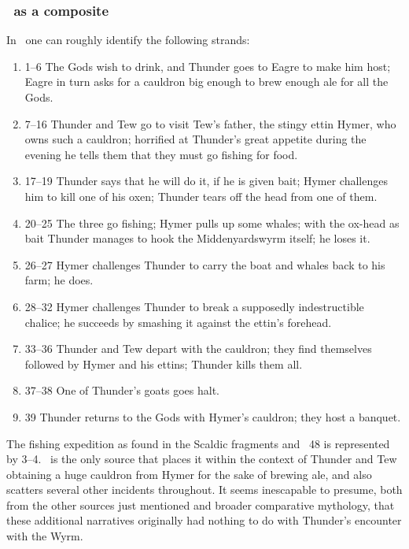 \subsubsection{\Hymiskvida\ as a composite}

{\small In \Hymiskvida\ one can roughly identify the following strands:

\begin{enumerate}
  \item 1–6 The Gods wish to drink, and Thunder goes to Eagre to make him host; Eagre in turn asks for a cauldron big enough to brew enough ale for all the Gods.
  \item 7–16 Thunder and Tew go to visit Tew’s father, the stingy ettin Hymer, who owns such a cauldron; horrified at Thunder’s great appetite during the evening he tells them that they must go fishing for food.
  \item 17–19 Thunder says that he will do it, if he is given bait; Hymer challenges him to kill one of his oxen; Thunder tears off the head from one of them.
  \item 20–25 The three go fishing; Hymer pulls up some whales; with the ox-head as bait Thunder manages to hook the Middenyardswyrm itself; he loses it.
  \item 26–27 Hymer challenges Thunder to carry the boat and whales back to his farm; he does.
  \item 28–32 Hymer challenges Thunder to break a supposedly indestructible chalice; he succeeds by smashing it against the ettin’s forehead.
  \item 33–36 Thunder and Tew depart with the cauldron; they find themselves followed by Hymer and his ettins; Thunder kills them all.
  \item 37–38 One of Thunder’s goats goes halt.
  \item 39 Thunder returns to the Gods with Hymer’s cauldron; they host a banquet.
\end{enumerate}

The fishing expedition as found in the Scaldic fragments and \Gylfaginning\ 48 is represented by 3–4.  \Hymiskvida\ is the only source that places it within the context of Thunder and Tew obtaining a huge cauldron from Hymer for the sake of brewing ale, and also scatters several other incidents throughout.  It seems inescapable to presume, both from the other sources just mentioned and broader comparative mythology, that these additional narratives originally had nothing to do with Thunder’s encounter with the Wyrm.

}
